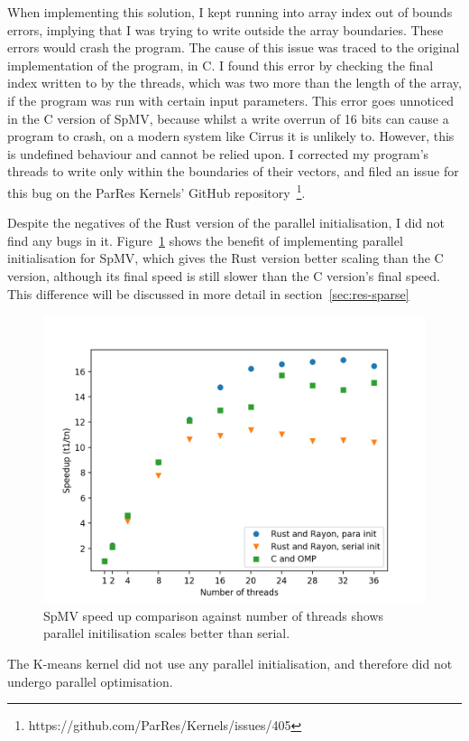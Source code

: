 When implementing this solution, I kept running into array index out of bounds errors, implying that I was trying to write outside the array boundaries. These errors would crash the program. The cause of this issue was traced to the original implementation of the program, in C. I found this error by checking the final index written to by the threads, which was two more than the length of the array, if the program was run with certain input parameters. This error goes unnoticed in the C version of SpMV, because whilst a write overrun of 16 bits can cause a program to crash, on a modern system like Cirrus it is unlikely to. However, this is undefined behaviour and cannot be relied upon. I corrected my program's threads to write only within the boundaries of their vectors, and filed an issue for this bug on the ParRes Kernels' GitHub repository~\footnote{https://github.com/ParRes/Kernels/issues/405}.

Despite the negatives of the Rust version of the parallel initialisation, I did not find any bugs in it. Figure~\ref{fig:sparse-speedup} shows the benefit of implementing parallel initialisation for SpMV, which gives the Rust version better scaling than the C version, although its final speed is still slower than the C version's final speed. This difference will be discussed in more detail in section~\ref{sec:res-sparse}

\begin{figure}[H]
    \centering
    \includegraphics[width=.8\linewidth]{figs/sparse/speedup.png}
    \caption[SpMV --- Speed up]{SpMV speed up comparison against number of threads shows parallel initilisation scales better than serial.}
    \label{fig:sparse-speedup}
\end{figure}

The K-means kernel did not use any parallel initialisation, and therefore did not undergo parallel optimisation.
